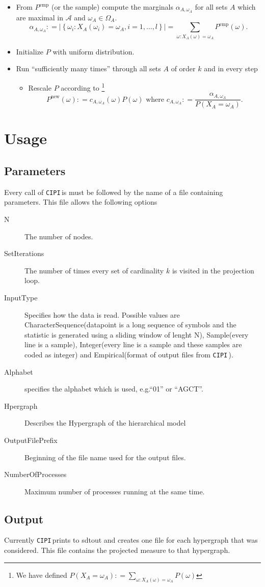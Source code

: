 \documentclass[12pt]{amsart}
\newcommand{\set}[1]{\left\lbrace #1 \right\rbrace} %
\newcommand{\defas}{\mathrel{\mathop{:}}=}   %
\providecommand{\abs}[1]{\left\lvert#1\right\rvert}
\newcommand{\eg}{e.g.\;}  %
\newcommand{\cipi}{\texttt{CIPI}\,}
\theoremstyle{plain}%
\theoremstyle{definition}
\theoremstyle{remark}
\begin{document}
\begin{itemize}
\item From $P^{\text{emp}}$ (or the sample) compute the marginals
  $\alpha_{A,\omega_A}$ for all sets $A$ which are maximal in $\mathcal{A}$ and 
  $\omega_A \in \Omega_A$.
  \begin{equation*}
    \alpha_{A,\omega_A} \defas \abs{\set{\omega_i : X_A(\omega_i)
        = \omega_A, i=1,\ldots,l}} = \sum_{\omega : X_A(\omega) = \omega_A}P^{\text{emp}}(\omega).
  \end{equation*}
\item Initialize $P$ with uniform distribution.
\item Run ``sufficiently many times'' through all sets $A$ of order
  $k$ and in every step
  \begin{itemize}
  \item Rescale $P$ according to \footnote{We have defined
      $P(X_A=\omega_A) \defas \sum_{\omega: X_A(\omega) = \omega_A}
      P(\omega)$}
    \begin{equation*}
      P^{\text{new}}(\omega) \defas c_{A,\omega_A}(\omega) P(\omega) \text{ where } c_{A,\omega_A} \defas \frac{\alpha_{A,\omega_A}}{P(X_A = \omega_A)}.
    \end{equation*}
  \end{itemize}
\end{itemize}


\section{Usage}
\label{sec:usage}
\subsection{Parameters}
Every call of \cipi is must be followed by the name of a file containing
parameters. This file allows the following options
\begin{description}
  \item[N] The number of nodes.
  \item[SetIterations] The number of times every set of cardinality $k$ is
    visited in the projection loop.
  \item[InputType] Specifies how the data is read. Possible values are CharacterSequence(datapoint is a long sequence of symbols and the
    statistic is generated using a sliding window of lenght N), Sample(every line is a sample), Integer(every line is a sample and these samples are coded as integer) and Empirical(format of output files from \cipi). 
  \item[Alphabet] specifies the alphabet which is used, \eg ``01'' or
    ``AGCT''. 
  \item[Hpergraph] Describes the Hypergraph of the hierarchical model
  \item[OutputFilePrefix] Beginning of the file name used for the output files. 
  \item[NumberOfProcesses] Maximum number of processes running at the same time. 
\end{description}

\subsection{Output}
Currently \cipi prints to sdtout and creates one file for each hypergraph that
was considered. This file contains the projected measure to that hypergraph.



\end{document}
